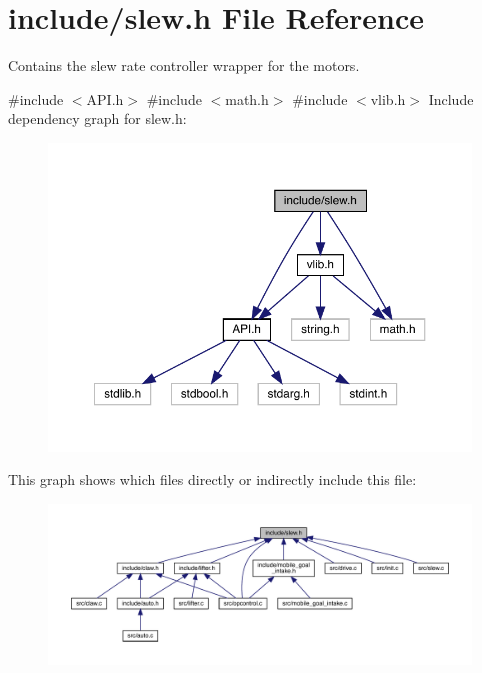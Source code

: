 \section{include/slew.h File Reference}
\label{slew_8h}


Contains the slew rate controller wrapper for the motors.  


{\ttfamily \#include $<$A\+P\+I.\+h$>$}\newline
{\ttfamily \#include $<$math.\+h$>$}\newline
{\ttfamily \#include $<$vlib.\+h$>$}\newline
Include dependency graph for slew.\+h\+:\nopagebreak
\begin{figure}[H]
\begin{center}
\leavevmode
\includegraphics[width=350pt]{slew_8h__incl}
\end{center}
\end{figure}
This graph shows which files directly or indirectly include this file\+:\nopagebreak
\begin{figure}[H]
\begin{center}
\leavevmode
\includegraphics[width=350pt]{slew_8h__dep__incl}
\end{center}
\end{figure}
